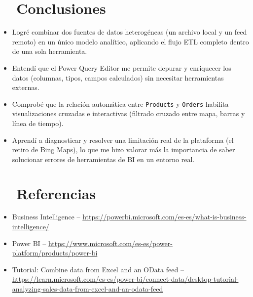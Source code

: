 \documentclass[11pt,a4paper]{article}
\begin{document}
\section{\faCheckCircle\ \ Conclusiones}
\begin{itemize}[leftmargin=1.6em, itemsep=6pt]
  \item[\textcolor{cMint}{\faCheckCircle}] Logré combinar dos fuentes de datos heterogéneas (un archivo local y un feed remoto) en un único modelo analítico, aplicando el flujo ETL completo dentro de una sola herramienta.
  \item[\textcolor{cMint}{\faCheckCircle}] Entendí que el Power Query Editor me permite depurar y enriquecer los datos (columnas, tipos, campos calculados) sin necesitar herramientas externas.
  \item[\textcolor{cMint}{\faCheckCircle}] Comprobé que la relación automática entre \texttt{Products} y \texttt{Orders} habilita visualizaciones cruzadas e interactivas (filtrado cruzado entre mapa, barras y línea de tiempo).
  \item[\textcolor{cMint}{\faCheckCircle}] Aprendí a diagnosticar y resolver una limitación real de la plataforma (el retiro de Bing Maps), lo que me hizo valorar más la importancia de saber solucionar errores de herramientas de BI en un entorno real.
\end{itemize}

\section{\faLink\ \ Referencias}
\begin{itemize}[leftmargin=1.6em, itemsep=4pt]
  \item[\textcolor{cCyan}{\faLink}] Business Intelligence -- \url{https://powerbi.microsoft.com/es-es/what-is-business-intelligence/}
  \item[\textcolor{cCyan}{\faLink}] Power BI -- \url{https://www.microsoft.com/es-es/power-platform/products/power-bi}
  \item[\textcolor{cCyan}{\faLink}] Tutorial: Combine data from Excel and an OData feed -- \url{https://learn.microsoft.com/es-es/power-bi/connect-data/desktop-tutorial-analyzing-sales-data-from-excel-and-an-odata-feed}
\end{itemize}
\end{document}
